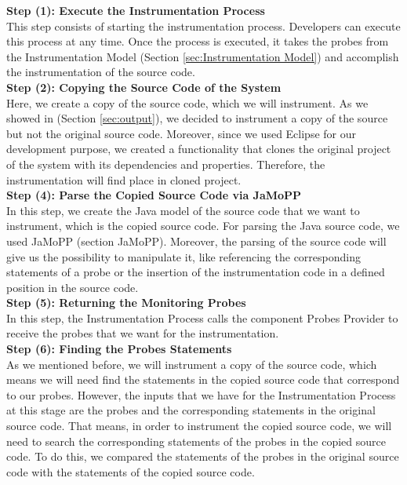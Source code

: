 \textbf{Step (1): Execute the Instrumentation Process}\\
This step consists of starting the instrumentation process. Developers can execute this process at any time. Once the process is executed, it takes the probes from the Instrumentation Model (Section \ref{sec:Instrumentation Model}) and accomplish the instrumentation of the source code. \\

\textbf{Step (2): Copying the Source Code of the System}\\
Here, we create a copy of the source code, which we will instrument. As we showed in (Section \ref{sec:output}), we decided to instrument a copy of the source but not the original source code. Moreover, since we used Eclipse for our development purpose, we created a functionality that clones the original project of the system with its dependencies and properties. Therefore, the instrumentation will find place in cloned project. \\ 

\textbf{Step (4): Parse the Copied Source Code via JaMoPP}\\
In this step, we create the Java model of the source code that we want to instrument, which is the copied source code. For parsing the Java source code, we used JaMoPP (section JaMoPP). Moreover, the parsing of the source code will give us the possibility to manipulate it, like referencing the corresponding statements of a probe or the insertion of the instrumentation code in a defined position in the source code.\\

\textbf{Step (5): Returning the Monitoring Probes}\\
In this step, the Instrumentation Process calls the component Probes Provider to receive the probes that we want for the instrumentation.\\

\textbf{Step (6): Finding the Probes Statements}\\
As we mentioned before, we will instrument a copy of the source code, which means we will need find the statements in the copied source code that correspond to our probes. However, the inputs that we have for the Instrumentation Process at this stage are the probes and the corresponding statements in the original source code. That means, in order to instrument the copied source code, we will need to search the corresponding statements of the probes in the copied source code. To do this, we compared the statements of the probes in the original source code with the statements of the copied source code. \\

